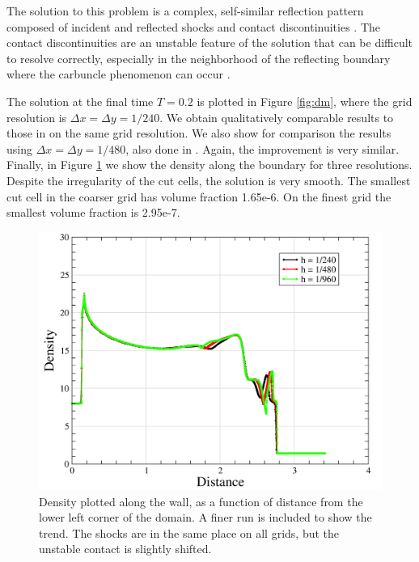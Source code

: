 The solution to this problem is a complex, self-similar reflection pattern 
composed of incident and reflected shocks and contact 
discontinuities \cite{WOODWARD1984115,rkdg5}.  
The contact discontinuities are an unstable feature of the solution that can be 
difficult to resolve correctly, especially in the neighborhood of the 
reflecting boundary where the carbuncle phenomenon can occur \cite{KEMM2018596}.

The solution at the final time $T = 0.2$ is plotted in Figure \ref{fig:dm}, 
where the grid resolution is $\Delta x = \Delta y = 1/240$.
We obtain qualitatively comparable results to those in \cite{rkdg5} on 
the same grid resolution. We also show for comparison the results using 
$\Delta x = \Delta y = 1/480$, also done in \cite{rkdg5}. Again, the
improvement is very similar. Finally, in Figure \ref{fig:wedgeBndry} we
show the density along the boundary for three resolutions. Despite the
irregularity of the cut cells, the solution is very smooth. The smallest
cut cell in the coarser grid has volume fraction 1.65e-6. On the finest
grid the smallest volume fraction is 2.95e-7. 

\begin{figure}[h]
\centering
\includegraphics[width=.7\linewidth]{figs/rampWall3.png}
\caption{\sf Density plotted along the wall, as a function of distance from
the lower left corner of the domain.  A finer run is included to show
the trend. The shocks are in the same place on all grids, but the 
unstable contact is slightly shifted.
} \label{fig:wedgeBndry}
\end{figure}


